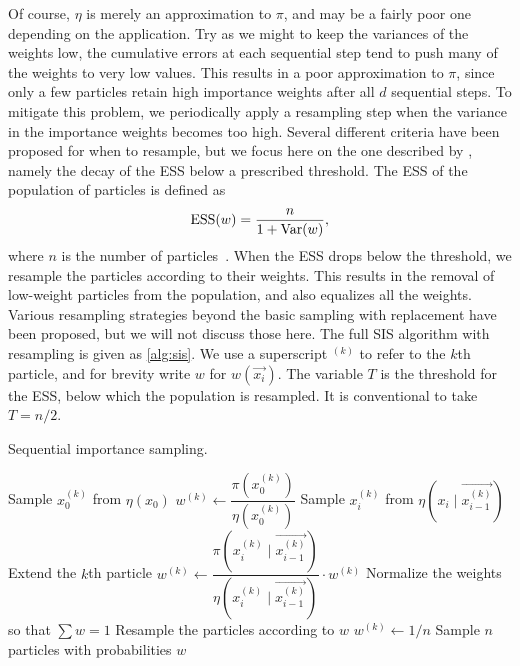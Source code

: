 Of course, $\eta$ is merely an approximation to $\pi$, and may be a fairly poor
one depending on the application. Try as we might to keep the variances of the
weights low, the cumulative errors at each sequential step tend to push many of
the weights to very low values. This results in a poor approximation to $\pi$,
since only a few particles retain high importance weights after all $d$
sequential steps. To mitigate this problem, we periodically apply a resampling
step when the variance in the importance weights becomes too high. Several
different criteria have been proposed for when to resample, but we focus here
on the one described by \textcite{liu2008monte}, namely the decay of the
\gls{ESS} below a prescribed threshold. The \gls{ESS} of the population of
particles is defined as
\[
  \operatorname{ESS}(w) = \frac{n}{1 + \operatorname{Var}(w)},
\]
where $n$ is the number of particles~\autocite{liu2008monte}. When the
\gls{ESS} drops below the threshold, we resample the particles according to
their weights. This results in the removal of low-weight particles from the
population, and also equalizes all the weights. Various resampling strategies
beyond the basic sampling with replacement have been proposed, but we will not
discuss those here. The full \gls{SIS} algorithm with resampling is given as
\cref{alg:sis}. We use a superscript $^{(k)}$ to refer to the $k$th particle,
and for brevity write $w$ for $w(\vec{x_i})$. The variable $T$ is the threshold
for the \gls{ESS}, below which the population is resampled. It is conventional
to take $T = n/2$.

\begin{algorithm}
  \caption{Sequential importance sampling.}
  \begin{algorithmic}
      \State Sample $x_0^{(k)}$ from $\eta(x_0)$
      \State $w^{(k)} \gets \dfrac{\pi\left(x_0^{(k)}\right)}{\eta\left(x_0^{(k)}\right)}$
    \EndFor
        \State Sample $x_i^{(k)}$ from $\eta\left(x_i \mid \vec{x_{i-1}^{(k)}}\right)$
        \Comment Extend the $k$th particle
        \State $w^{(k)} \gets \dfrac{\pi\left(x_i^{(k)} \mid \vec{x_{i-1}^{(k)}}\right)}{\eta\left(x_i^{(k)} \mid \vec{x_{i-1}^{(k)}}\right)} \cdot w^{(k)}$
      \EndFor
      \State Normalize the weights so that $\sum w = 1$
        \State Resample the particles according to $w$
          \State $w^{(k)} \gets 1/n$
        \EndFor
      \EndIf
    \EndFor
    \State Sample $n$ particles with probabilities $w$
  \end{algorithmic}
  \label{alg:sis}
\end{algorithm}


